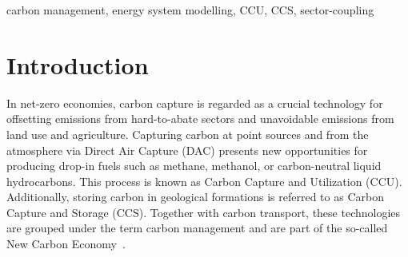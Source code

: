 \documentclass[conference]{IEEEtran}
\newcommand{\carbon}{CO$_2$}
\begin{document}




\begin{IEEEkeywords}
    carbon management, energy system modelling, CCU, CCS, sector-coupling
\end{IEEEkeywords}


\section{Introduction}
\label{sec:introduction}

In net-zero economies, carbon capture is regarded as a crucial technology for offsetting emissions from hard-to-abate sectors and unavoidable emissions from land use and agriculture. Capturing carbon at point sources and from the atmosphere via Direct Air Capture (DAC) presents new opportunities for producing drop-in fuels such as methane, methanol, or carbon-neutral liquid hydrocarbons. This process is known as Carbon Capture and Utilization (CCU). Additionally, storing carbon in geological formations is referred to as Carbon Capture and Storage (CCS). Together with carbon transport, these technologies are grouped under the term carbon management and are part of the so-called New Carbon Economy~\cite{arniehellerNewCarbonEconomy2019}.
\end{document}
